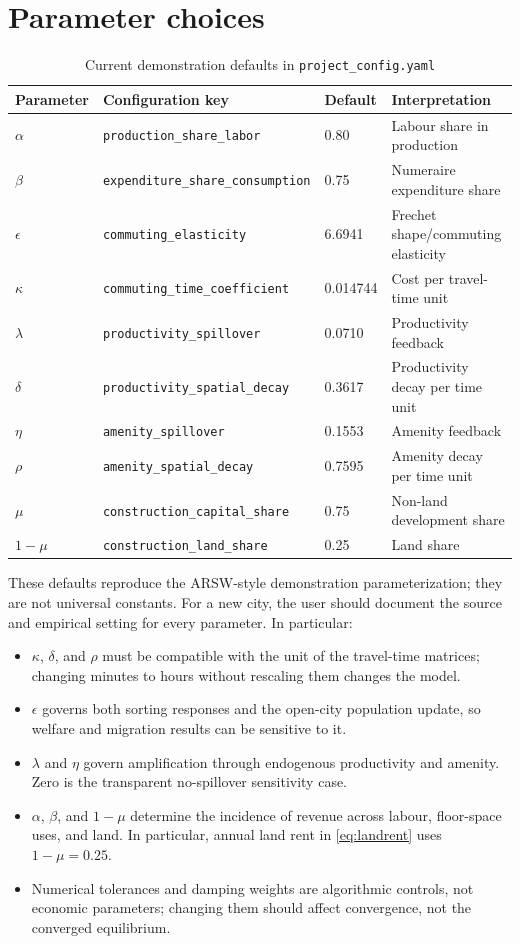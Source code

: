 \documentclass[11pt,a4paper]{article}
\begin{document}
\section{Parameter choices}
\begin{table}[ht]
\centering\small
\caption{Current demonstration defaults in \texttt{project\_config.yaml}}
\begin{tabular}{llll}
\toprule Parameter & Configuration key & Default & Interpretation\\
\midrule
$\alpha$ & \texttt{production\_share\_labor} & 0.80 & Labour share in production\\
$\beta$ & \texttt{expenditure\_share\_consumption} & 0.75 & Numeraire expenditure share\\
$\epsilon$ & \texttt{commuting\_elasticity} & 6.6941 & Frechet shape/commuting elasticity\\
$\kappa$ & \texttt{commuting\_time\_coefficient} & 0.014744 & Cost per travel-time unit\\
$\lambda$ & \texttt{productivity\_spillover} & 0.0710 & Productivity feedback\\
$\delta$ & \texttt{productivity\_spatial\_decay} & 0.3617 & Productivity decay per time unit\\
$\eta$ & \texttt{amenity\_spillover} & 0.1553 & Amenity feedback\\
$\rho$ & \texttt{amenity\_spatial\_decay} & 0.7595 & Amenity decay per time unit\\
$\mu$ & \texttt{construction\_capital\_share} & 0.75 & Non-land development share\\
$1-\mu$ & \texttt{construction\_land\_share} & 0.25 & Land share\\
\bottomrule
\end{tabular}
\end{table}

These defaults reproduce the ARSW-style demonstration parameterization; they
are not universal constants. For a new city, the user should document the
source and empirical setting for every parameter. In particular:
\begin{itemize}
\item $\kappa$, $\delta$, and $\rho$ must be compatible with the unit of the
travel-time matrices; changing minutes to hours without rescaling them changes
the model.
\item $\epsilon$ governs both sorting responses and the open-city population
update, so welfare and migration results can be sensitive to it.
\item $\lambda$ and $\eta$ govern amplification through endogenous productivity
and amenity. Zero is the transparent no-spillover sensitivity case.
\item $\alpha$, $\beta$, and $1-\mu$ determine the incidence of revenue across
labour, floor-space uses, and land. In particular, annual land rent in
\eqref{eq:landrent} uses $1-\mu=0.25$.
\item Numerical tolerances and damping weights are algorithmic controls, not
economic parameters; changing them should affect convergence, not the
converged equilibrium.
\end{itemize}
\end{document}
